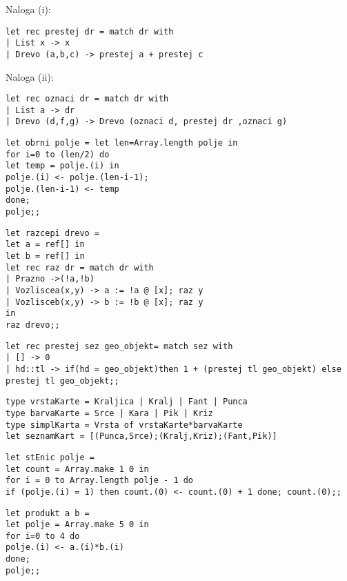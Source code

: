 \begin{Odgovor}{2.42}
Naloga (i):
\begin{lstlisting}
let rec prestej dr = match dr with
| List x -> x
| Drevo (a,b,c) -> prestej a + prestej c
\end{lstlisting}
Naloga (ii):
\begin{lstlisting}
let rec oznaci dr = match dr with
| List a -> dr
| Drevo (d,f,g) -> Drevo (oznaci d, prestej dr ,oznaci g)
\end{lstlisting}
\end{Odgovor}
\begin{Odgovor}{2.56}
\begin{lstlisting}
let obrni polje = let len=Array.length polje in
for i=0 to (len/2) do
let temp = polje.(i) in
polje.(i) <- polje.(len-i-1);
polje.(len-i-1) <- temp
done;
polje;;
\end{lstlisting}
\end{Odgovor}
\begin{Odgovor}{2.58}
\begin{lstlisting}
let razcepi drevo =
let a = ref[] in
let b = ref[] in
let rec raz dr = match dr with
| Prazno ->(!a,!b)
| Vozliscea(x,y) -> a := !a @ [x]; raz y
| Vozlisceb(x,y) -> b := !b @ [x]; raz y
in
raz drevo;;
\end{lstlisting}
\end{Odgovor}
\begin{Odgovor}{2.71}
\begin{lstlisting}
let rec prestej sez geo_objekt= match sez with
| [] -> 0
| hd::tl -> if(hd = geo_objekt)then 1 + (prestej tl geo_objekt) else prestej tl geo_objekt;;
\end{lstlisting}
\end{Odgovor}
\begin{Odgovor}{2.75}
\begin{lstlisting}
type vrstaKarte = Kraljica | Kralj | Fant | Punca
type barvaKarte = Srce | Kara | Pik | Kriz
type simplKarta = Vrsta of vrstaKarte*barvaKarte
let seznamKart = [(Punca,Srce);(Kralj,Kriz);(Fant,Pik)]
\end{lstlisting}
\end{Odgovor}
\begin{Odgovor}{3.5}
\begin{lstlisting}
let stEnic polje =
let count = Array.make 1 0 in
for i = 0 to Array.length polje - 1 do
if (polje.(i) = 1) then count.(0) <- count.(0) + 1 done; count.(0);;
\end{lstlisting}
\end{Odgovor}
\begin{Odgovor}{3.6}
\begin{lstlisting}
let produkt a b =
let polje = Array.make 5 0 in
for i=0 to 4 do
polje.(i) <- a.(i)*b.(i)
done;
polje;;
\end{lstlisting}
\end{Odgovor}
